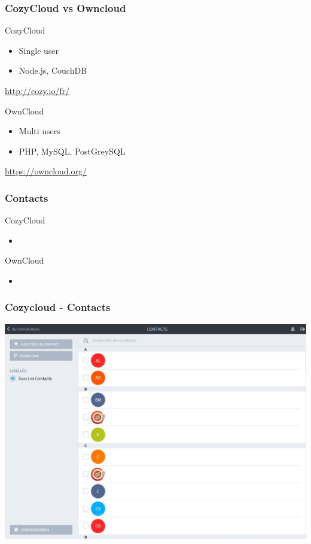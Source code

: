 \documentclass{beamer}
\begin{document}
\begin{frame}
\frametitle{CozyCloud vs Owncloud}

\begin{block}{CozyCloud}
\begin{itemize}
\item Single user
\item Node.js, CouchDB
\end{itemize}
\url{http://cozy.io/fr/}
\end{block}

\begin{block}{OwnCloud}
\begin{itemize}
\item Multi users
\item PHP, MySQL, PostGreySQL
\end{itemize}
\url{https://owncloud.org/}
\end{block}
\end{frame}

\begin{frame}
\frametitle{Contacts}

\begin{block}{CozyCloud}
\begin{itemize}
\item 
\end{itemize}
\end{block}

\begin{block}{OwnCloud}
\begin{itemize}
\item 
\end{itemize}
\end{block}
\end{frame}

\begin{frame}
\frametitle{Cozycloud - Contacts}
\includegraphics[scale=0.3] {./CozyCloud/CozyCloud_Contacts.jpg}
\end{frame}
\end{document}
